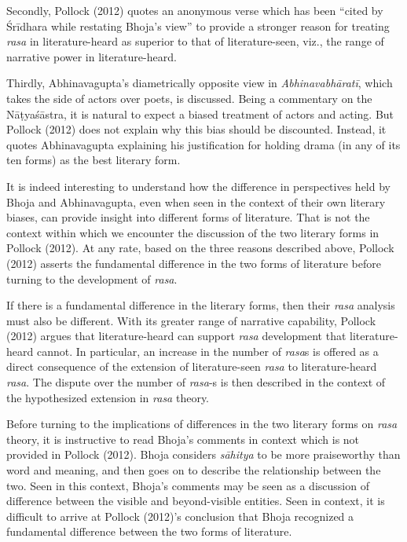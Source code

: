 Secondly, Pollock (2012) quotes an anonymous verse which has been “cited by Śrīdhara while restating Bhoja’s view” to provide a stronger reason for treating \textsl{rasa }in literature-heard as superior to that of literature-seen, viz., the range of narrative power in literature-heard. 

Thirdly, Abhinavagupta’s diametrically opposite view in \textsl{Abhinavabhāratī}, which takes the side of actors over poets, is discussed. Being a commentary on the Nāṭyaśāstra, it is natural to expect a biased treatment of actors and acting. But Pollock (2012) does not explain why this bias should be discounted. Instead, it quotes Abhinavagupta explaining his justification for holding drama (in any of its ten forms) as the best literary form. 

It is indeed interesting to understand how the difference in perspectives held by Bhoja and Abhinavagupta, even when seen in the context of their own literary biases, can provide insight into different forms of literature. That is not the context within which we encounter the discussion of the two literary forms in Pollock (2012). At any rate, based on the three reasons described above, Pollock (2012) asserts the fundamental difference in the two forms of literature before turning to the development of \textsl{rasa}. 

If there is a fundamental difference in the literary forms, then their \textsl{rasa }analysis must also be different. With its greater range of narrative capability, Pollock (2012) argues that literature-heard can support \textsl{rasa} development that literature-heard cannot. In particular, an increase in the number of \textsl{rasa}s is offered as a direct consequence of the extension of literature-seen \textsl{rasa }to literature-heard \textsl{rasa}. The dispute over the number of \textsl{rasa}-s is then described in the context of the hypothesized extension in \textsl{rasa} theory. 

Before turning to the implications of differences in the two literary forms on \textsl{rasa }theory, it is instructive to read Bhoja’s comments in context which is not provided in Pollock (2012). Bhoja considers \textsl{sāhitya} to be more praiseworthy than word and meaning, and then goes on to describe the relationship between the two. Seen in this context, Bhoja’s comments may be seen as a discussion of difference between the visible and beyond-visible entities. Seen in context, it is difficult to arrive at Pollock (2012)’s conclusion that Bhoja recognized a fundamental difference between the two forms of literature.


